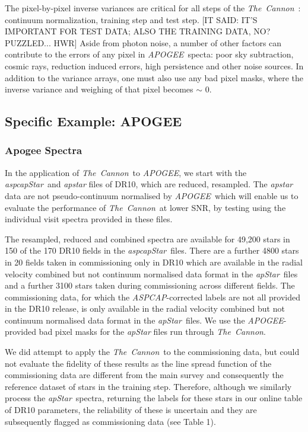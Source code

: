 \documentclass[12pt, preprint]{aastex}
\newcommand{\tc}{\textsl{The~Cannon}}
\newcommand{\apogee}{\textsl{APOGEE}}
\newcommand{\aspcap}{\textsl{ASPCAP}}
\newcommand{\aspcapstar}{\textsl{aspcapStar}}
\newcommand{\apstar}{\textsl{apStar}}
\begin{document}
The pixel-by-pixel inverse variances are critical for all steps of the \tc\ : continuum normalization, training step and test step.  
[IT SAID: IT'S IMPORTANT FOR TEST DATA; ALSO THE TRAINING DATA, NO? PUZZLED... HWR]
Aside from photon noise, a number of other factors can contribute to the errors of any pixel in \apogee\ specta: poor sky subtraction, cosmic rays, reduction induced errors, high persistence and other noise sources. In addition to the variance arrays, one must also use any bad pixel masks, where the 
inverse variance and weighing of that pixel becomes $\sim$ 0. 


\subsection{Specific Example: APOGEE}

\subsubsection{ Apogee Spectra}

In the application of \tc\ to  \apogee, we start with the \aspcapstar\ and \textit{apstar} files of DR10,
which are reduced,  resampled. 
The \textit{apstar}  data are not pseudo-continuum normalised by \apogee\,
which will enable us to evaluate the performance of \tc\ at lower SNR, by testing using the individual visit spectra provided in these files. 

The resampled, reduced and combined spectra are available for 49,200 stars in 150 of the 170 DR10 fields in the \aspcapstar\ files. There are a further 4800 stars in 20 fields taken in commissioning only in DR10 which are available in the radial velocity combined but not continuum normalised data format in the \apstar\ files and a further 3100 stars taken during commissioning across different fields. 
The commissioning data, for which the \aspcap-corrected labels are not all provided in the DR10 release, is only available in the radial velocity combined but not continuum normalised data format in the \apstar\ files. 
We use the \apogee -provided bad pixel masks for the \textit{apStar} files run through \tc .

We did attempt to apply the \tc\ to the commissioning data, but could not evaluate the fidelity of these results as the line spread function of the commissioning data are different from the main survey and consequently the reference dataset of stars in the training step. 
Therefore, although we similarly process the \apstar\ spectra, returning the labels for these stars in our online table of DR10 parameters, the reliability of these is uncertain and they are subsequently flagged as commissioning data (see Table 1).
\end{document}
